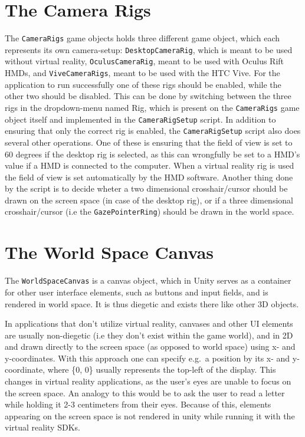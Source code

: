\section{The Camera Rigs}
The \texttt{CameraRigs} game objects holds three different game object, which each represents its own camera-setup: \texttt{DesktopCameraRig}, which is meant to be used
without virtual reality, \texttt{OculusCameraRig}, meant to be used with Oculus Rift HMDs, and \texttt{ViveCameraRigs}, meant to be used with the HTC Vive.
For the application to run successfully one of these rigs should be enabled, while the other two should be disabled.
This can be done by switching between the three rigs in the dropdown-menu named Rig, which is present on the \texttt{CameraRigs} game object itself and
implemented in the \texttt{CameraRigSetup} script. In addition to ensuring that only the correct rig is enabled, 
the \texttt{CameraRigSetup} script also does several other operations. One of these is ensuring that the field of view is set to 60 degrees if the desktop rig 
is selected, as this can wrongfully be set to a HMD's value if a HMD is connected to the computer. When a virtual reality rig is used the field of view is 
set automatically by the HMD software. Another thing done by the script is to decide wheter a two dimensional crosshair/cursor should be drawn on the screen space
(in case of the desktop rig), or if a three dimensional crosshair/cursor (i.e the \texttt{GazePointerRing}) should be drawn in the world space. 

\section{The World Space Canvas}
The \texttt{WorldSpaceCanvas} is a canvas object, which in Unity serves as a container for other user interface elements, such as buttons and input fields, 
and is rendered in world space. It is thus diegetic and exists there like other 3D objects.

In applications that don't utilize virtual reality, canvases and other UI elements are usually non-diegetic (i.e they don't exist within the game world), 
and in 2D and drawn directly to the screen space (as opposed to world space) using x- and y-coordinates.
With this approach one can specify e.g.~a position by its x- and y-coordinate, where \{0, 0\} usually represents the top-left of the display.
This changes in virtual reality applications, as the user's eyes are unable to focus on the screen space. An analogy to this would be to 
ask the user to read a letter while holding it 2-3 centimeters from their eyes. Because of this, elements appearing on the screen space is not rendered
in unity while running it with the virtual reality SDKs. 

